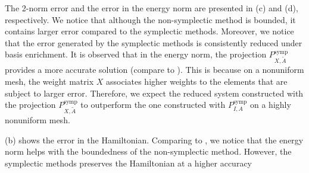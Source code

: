 The 2-norm error and the error in the energy norm are presented in (c) and (d), respectively. We notice that although the non-symplectic method is bounded, it contains larger error compared to the symplectic methods. Moreover, we notice that the error generated by the symplectic methods is consistently reduced under basis enrichment. It is observed that in the energy norm, the projection $P_{X,\tilde A}^{\text{symp}}$ provides a more accurate solution (compare to ). This is because on a nonuniform mesh, the weight matrix $X$ associates higher weights to the elements that are subject to larger error. Therefore, we expect the reduced system constructed with the projection $P_{X,\tilde A}^{\text{symp}}$ to outperform the one constructed with $P_{I,A}^{\text{symp}}$ on a highly nonuniform mesh.

(b) shows the error in the Hamiltonian. Comparing to , we notice that the energy norm helps with the boundedness of the non-symplectic method. However, the symplectic methods preserves the Hamiltonian at a higher accuracy

